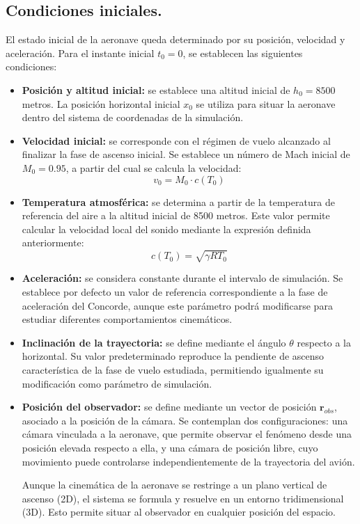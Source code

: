 \documentclass[10.5pt]{article}
\begin{document}
	\subsection{Condiciones iniciales.}
	
	El estado inicial de la aeronave queda determinado por su posición, velocidad y aceleración. Para el instante inicial $t_0=0$, se establecen las siguientes condiciones:
	
	\begin{itemize}
		
		\item \textbf{Posición y altitud inicial:} se establece una altitud inicial de $h_0=8500$ metros. La posición horizontal inicial $x_0$ se utiliza para situar la aeronave dentro del sistema de coordenadas de la simulación.
		
		\item \textbf{Velocidad inicial:} se corresponde con el régimen de vuelo alcanzado al finalizar la fase de ascenso inicial. Se establece un número de Mach inicial de $M_0=0.95$, a partir del cual se calcula la velocidad:
		\begin{equation*}
			v_0 = M_0 \cdot c(T_0)
		\end{equation*}
		
		\item \textbf{Temperatura atmosférica:} se determina a partir de la temperatura de referencia del aire a la altitud inicial de 8500 metros. Este valor permite calcular la velocidad local del sonido mediante la expresión definida anteriormente:
		\begin{equation*}
			c(T_0) = \sqrt{\gamma R T_0}
		\end{equation*}
		
		\item \textbf{Aceleración:} se considera constante durante el intervalo de simulación. Se establece por defecto un valor de referencia correspondiente a la fase de aceleración del Concorde, aunque este parámetro podrá modificarse para estudiar diferentes comportamientos cinemáticos.
		
		\item \textbf{Inclinación de la trayectoria:} se define mediante el ángulo $\theta$ respecto a la horizontal. Su valor predeterminado reproduce la pendiente de ascenso característica de la fase de vuelo estudiada, permitiendo igualmente su modificación como parámetro de simulación.
		
		\item \textbf{Posición del observador:} se define mediante un vector de posición $\mathbf{r}_{obs}$, asociado a la posición de la cámara. Se contemplan dos configuraciones: una cámara vinculada a la aeronave, que permite observar el fenómeno desde una posición elevada respecto a ella, y una cámara de posición libre, cuyo movimiento puede controlarse independientemente de la trayectoria del avión.
		
		Aunque la cinemática de la aeronave se restringe a un plano vertical de ascenso (2D), el sistema se formula y resuelve en un entorno tridimensional (3D). Esto permite situar al observador en cualquier posición del espacio.
		
	\end{itemize}
	
\end{document}
